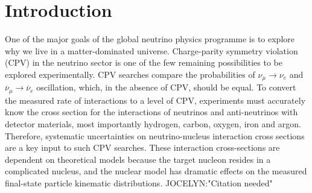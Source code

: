 \section{Introduction}
One of the major goals of the global neutrino physics programme is to explore why we live in a matter-dominated universe. Charge-parity symmetry violation (CPV) in the neutrino sector is one of the few remaining possibilities to be explored experimentally. 
CPV searches compare the probabilities of $\nu_{\mu}\!\rightarrow\!\nu_e$ and $\overline{\nu}_{\mu}\!\rightarrow\!\overline{\nu}_e$ oscillation, which, in the absence of CPV, should be equal. 
To convert the measured rate of interactions to a level of CPV, experiments must accurately know the cross section for the interactions of neutrinos and anti-neutrinos with detector materials, most importantly hydrogen, carbon, oxygen, iron and argon. 
Therefore, systematic uncertainties on neutrino-nucleus interaction cross sections are a key input to such CPV searches.  
These interaction cross-sections are dependent on theoretical models because the target nucleon resides in a complicated nucleus, and the nuclear model has dramatic effects on the measured final-state particle kinematic distributions. JOCELYN:"Citation needed"

